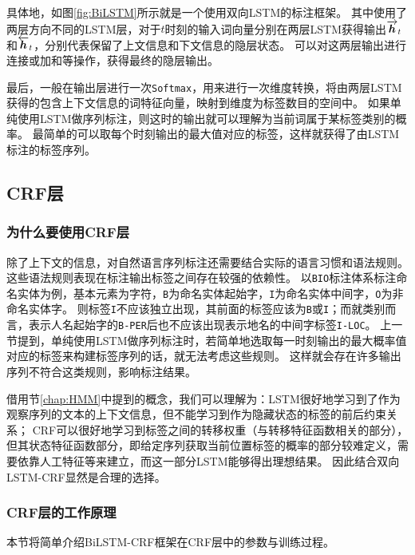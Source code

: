 具体地，如图\ref{fig:BiLSTM}所示就是一个使用双向LSTM的标注框架。
其中使用了两层方向不同的LSTM层，对于$t$时刻的输入词向量分别在两层LSTM获得输出$\overrightarrow{\boldsymbol{h}}_t$和$\overleftarrow{\boldsymbol{h}}_t$，分别代表保留了上文信息和下文信息的隐层状态。
可以对这两层输出进行连接或加和等操作，获得最终的隐层输出。

最后，一般在输出层进行一次\verb|Softmax|，用来进行一次维度转换，将由两层LSTM获得的包含上下文信息的词特征向量，映射到维度为标签数目的空间中。
如果单纯使用LSTM做序列标注，则这时的输出就可以理解为当前词属于某标签类别的概率。
最简单的可以取每个时刻输出的最大值对应的标签，这样就获得了由LSTM标注的标签序列。
\subsection{CRF层}
\subsubsection{为什么要使用CRF层}
除了上下文的信息，对自然语言序列标注还需要结合实际的语言习惯和语法规则。
这些语法规则表现在标注输出标签之间存在较强的依赖性。
以\verb|BIO|标注体系标注命名实体为例，基本元素为字符，\verb|B|为命名实体起始字，\verb|I|为命名实体中间字，\verb|O|为非命名实体字。
则标签\verb|I|不应该独立出现，其前面的标签应该为\verb|B|或\verb|I|；而就类别而言，表示人名起始字的\verb|B-PER|后也不应该出现表示地名的中间字标签\verb|I-LOC|。
上一节提到，单纯使用LSTM做序列标注时，若简单地选取每一时刻输出的最大概率值对应的标签来构建标签序列的话，就无法考虑这些规则。
这样就会存在许多输出序列不符合这类规则，影响标注结果。

借用节\ref{chap:HMM}中提到的概念，我们可以理解为：LSTM很好地学习到了作为观察序列的文本的上下文信息，但不能学习到作为隐藏状态的标签的前后约束关系；
CRF可以很好地学习到标签之间的转移权重（与转移特征函数相关的部分），但其状态特征函数部分，即给定序列获取当前位置标签的概率的部分较难定义，需要依靠人工特征等来建立，而这一部分LSTM能够得出理想结果。
因此结合双向LSTM-CRF显然是合理的选择。
\subsubsection{CRF层的工作原理}
本节将简单介绍BiLSTM-CRF框架在CRF层中的参数与训练过程。

